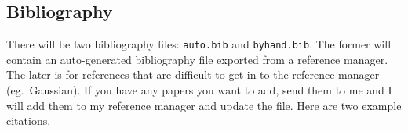 \subsection{Bibliography}
There will be two bibliography files: \texttt{auto.bib} and \texttt{byhand.bib}.
The former will contain an auto-generated bibliography file exported from a reference manager.
The later is for references that are difficult to get in to the reference manager (eg.~Gaussian).
If you have any papers you want to add, send them to me and I will add them to my reference manager and update the file.
Here are two example citations\cite{jacak_computational_2012,renfrew_incorporation_2012}.
